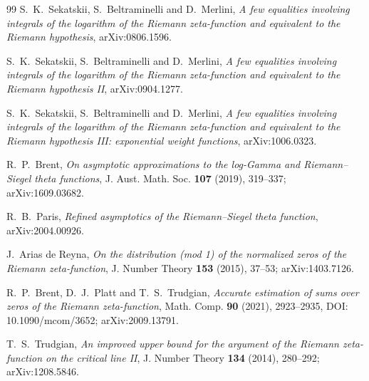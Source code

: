 \documentclass[11pt]{amsart}
\numberwithin{equation}{section}
\theoremstyle{definition}
\theoremstyle{remark}
\begin{document}
\begin{thebibliography}{99}
S.~K.~Sekatskii, S.~Beltraminelli and D.~Merlini,
\emph{A few equalities involving integrals of the logarithm of the Riemann zeta-function and equivalent to the Riemann hypothesis},
arXiv:0806.1596.

S.~K.~Sekatskii, S.~Beltraminelli and D.~Merlini,
\emph{A few equalities involving integrals of the logarithm of the Riemann zeta-function and equivalent to the Riemann hypothesis II},
arXiv:0904.1277.

S.~K.~Sekatskii, S.~Beltraminelli and D.~Merlini,
\emph{A few equalities involving integrals of the logarithm of the Riemann zeta-function and equivalent to the Riemann hypothesis III: exponential weight functions},
arXiv:1006.0323.

R.~P.~Brent,
\emph{On asymptotic approximations to the log-Gamma and Riemann--Siegel theta functions},
J. Aust. Math. Soc. \textbf{107} (2019), 319--337;
arXiv:1609.03682.

R.~B.~Paris,
\emph{Refined asymptotics of the Riemann--Siegel theta function},
arXiv:2004.00926.

J.~Arias de Reyna,
\emph{On the distribution (mod 1) of the normalized zeros of the Riemann zeta-function},
J. Number Theory \textbf{153} (2015), 37--53; arXiv:1403.7126.

R.~P.~Brent, D.~J.~Platt and T.~S.~Trudgian,
\emph{Accurate estimation of sums over zeros of the Riemann zeta-function},
Math. Comp. \textbf{90} (2021), 2923--2935, DOI: 10.1090/mcom/3652; arXiv:2009.13791.

T.~S.~Trudgian,
\emph{An improved upper bound for the argument of the Riemann zeta-function on the critical line II},
J. Number Theory \textbf{134} (2014), 280--292; arXiv:1208.5846.

\end{thebibliography}
\end{document}
